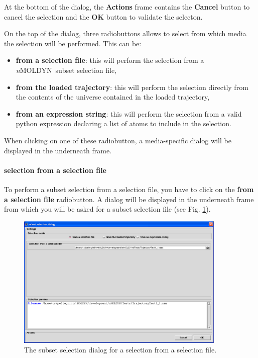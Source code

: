 \documentclass[a4paper,11pt]{report}
\newcommand{\NMOLDYN}{\textit{n}MOLDYN}
\begin{document}
At the bottom of the dialog, the \textbf{Actions} frame contains the \textbf{Cancel} button to cancel the selection and 
the \textbf{OK} button to validate the selecton.

On the top of the dialog, three radiobuttons allows to select from which media the selection will be performed. This can 
be:
\begin{itemize}
\item \textbf{from a selection file}: this will perform the selection from a \NMOLDYN\ subset selection file,
\item \textbf{from the loaded trajectory}: this will perform the selection directly from the contents of the universe contained 
in the loaded trajectory,
\item \textbf{from an expression string}: this will perform the selection from a valid python expression declaring a list 
of  atoms to include in the selection.
\end{itemize}
When clicking on one of these radiobutton, a media-specific dialog will be displayed in the underneath frame.

\paragraph{selection from a selection file\\}
\label{subset_selection_from_a_selection_file}
To perform a subset selection from a selection file, you have to click on the \textbf{from a selection file} radiobutton. 
A dialog will be displayed in the underneath frame from which you will be asked for a subset selection file 
(see Fig. \ref{fig:subset_selection_from_a_selection_file}).
\newpage
\begin{figure}[h!]
\begin{center}
\includegraphics[width=10cm]{Figures/subset_selection_from_a_selection_file.eps}
\end{center}
\caption[The subset selection dialog for a selection from a selection file]{The subset selection dialog for a selection from a selection file.}
\label{fig:subset_selection_from_a_selection_file}
\end{figure}   
\end{document}
